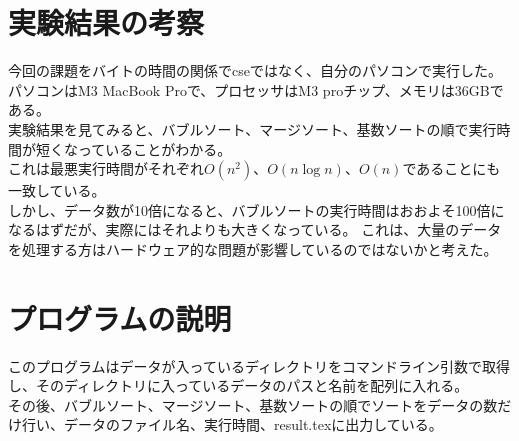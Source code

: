 \documentclass{jsarticle}
\begin{document}
\section{実験結果の考察}
今回の課題をバイトの時間の関係でcseではなく、自分のパソコンで実行した。\\
パソコンはM3 MacBook Proで、プロセッサはM3 proチップ、メモリは36GBである。\\
実験結果を見てみると、バブルソート、マージソート、基数ソートの順で実行時間が短くなっていることがわかる。\\
これは最悪実行時間がそれぞれ$O(n^2)$、$O(n\log n)$、$O(n)$であることにも一致している。\\
しかし、データ数が10倍になると、バブルソートの実行時間はおおよそ100倍になるはずだが、実際にはそれよりも大きくなっている。
これは、大量のデータを処理する方はハードウェア的な問題が影響しているのではないかと考えた。\\
\section{プログラムの説明}
このプログラムはデータが入っているディレクトリをコマンドライン引数で取得し、そのディレクトリに入っているデータのパスと名前を配列に入れる。\\
その後、バブルソート、マージソート、基数ソートの順でソートをデータの数だけ行い、データのファイル名、実行時間、result.texに出力している。\\
\end{document}
